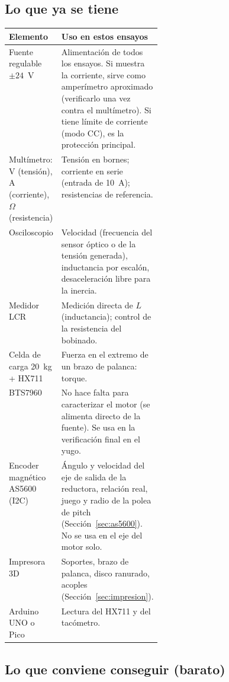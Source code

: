\documentclass[11pt,a4paper]{article}
\begin{document}
\subsection{Lo que ya se tiene}

\begin{center}
\begin{tabularx}{\linewidth}{>{\raggedright\arraybackslash}p{0.30\linewidth}X}
\toprule
Elemento & Uso en estos ensayos \\
\midrule
Fuente regulable $\pm 24$~V & Alimentación de todos los ensayos. Si muestra la corriente, sirve como amperímetro aproximado (verificarlo una vez contra el multímetro). Si tiene límite de corriente (modo CC), es la protección principal. \\
Multímetro: V (tensión), A (corriente), $\Omega$ (resistencia) & Tensión en bornes; corriente en serie (entrada de 10~A); resistencias de referencia. \\
Osciloscopio & Velocidad (frecuencia del sensor óptico o de la tensión generada), inductancia por escalón, desaceleración libre para la inercia. \\
Medidor LCR & Medición directa de $L$ (inductancia); control de la resistencia del bobinado. \\
Celda de carga 20~kg + HX711 & Fuerza en el extremo de un brazo de palanca: torque. \\
BTS7960 & No hace falta para caracterizar el motor (se alimenta directo de la fuente). Se usa en la verificación final en el yugo. \\
Encoder magnético AS5600 (I2C) & Ángulo y velocidad del eje de salida de la reductora, relación real, juego y radio de la polea de pitch (Sección~\ref{sec:as5600}). No se usa en el eje del motor solo. \\
Impresora 3D & Soportes, brazo de palanca, disco ranurado, acoples (Sección~\ref{sec:impresion}). \\
Arduino UNO o Pico & Lectura del HX711 y del tacómetro. \\
\bottomrule
\end{tabularx}
\end{center}

\subsection{Lo que conviene conseguir (barato)}
\end{document}
